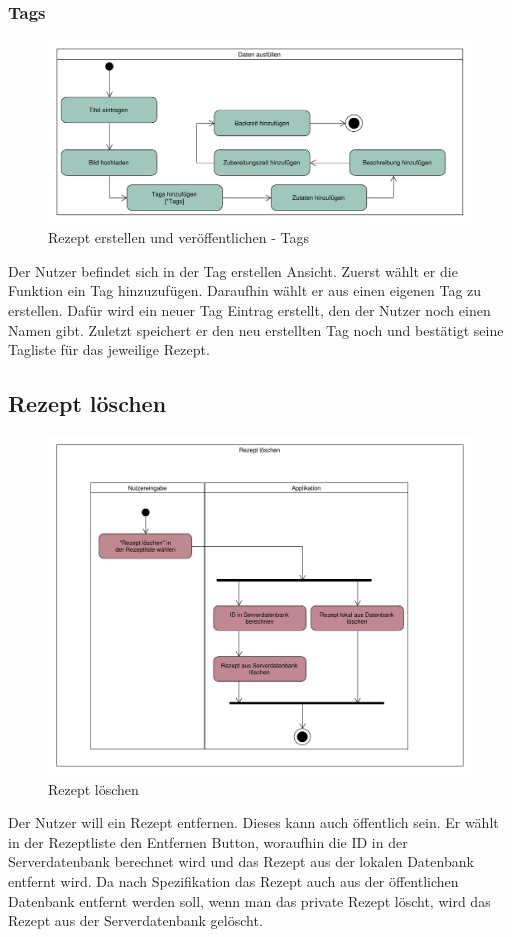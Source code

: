 \subsubsection{Tags}
\begin{figure}[H]
	\centering
	\includegraphics[width=\textwidth]{pics/dynamicDiagram/newAktivitaetsdiagrammRezepterstellenTags.pdf}%
	\caption{Rezept erstellen und veröffentlichen - Tags}%
	\label{diagram}%
\end{figure}

Der Nutzer befindet sich in der Tag erstellen Ansicht. Zuerst wählt er die Funktion ein Tag hinzuzufügen. Daraufhin wählt er aus einen eigenen Tag zu erstellen. Dafür wird ein neuer Tag Eintrag erstellt, den der Nutzer noch einen Namen gibt. Zuletzt speichert er den neu erstellten Tag noch und bestätigt seine Tagliste für das jeweilige Rezept. 


\subsection{Rezept löschen}
\begin{figure}[H]
	\centering
	\includegraphics[width=\textwidth]{pics/dynamicDiagram/DeleteRecipeAktivitaetsDiagramm.pdf}%
	\caption{Rezept löschen}%
	\label{diagram}%
\end{figure}

Der Nutzer will ein Rezept entfernen. Dieses kann auch öffentlich sein. Er wählt in der Rezeptliste den Entfernen Button, woraufhin die ID in der Serverdatenbank berechnet wird und das Rezept aus der lokalen Datenbank entfernt wird. Da nach Spezifikation das Rezept auch aus der öffentlichen Datenbank entfernt werden soll, wenn man das private Rezept löscht, wird das Rezept aus der Serverdatenbank gelöscht.

